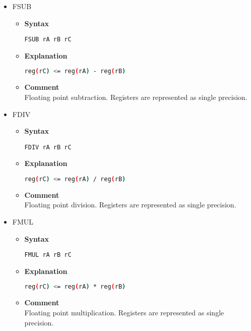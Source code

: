 \begin{itemize}
    \item FSUB
    \begin{itemize}
        \item \textbf{Syntax}
        \begin{lstlisting}[language={[markII]Assembler}, frame=single]
    FSUB rA rB rC
        \end{lstlisting}
        \item \textbf{Explanation}
        \begin{lstlisting}[language=bash, frame=single]
    reg(rC) <= reg(rA) - reg(rB)
        \end{lstlisting}
        \item \textbf{Comment} \\
        Floating point subtraction. Registers are represented as single precision.
    \end{itemize}

    \item FDIV
    \begin{itemize}
        \item \textbf{Syntax}
        \begin{lstlisting}[language={[markII]Assembler}, frame=single]
    FDIV rA rB rC
        \end{lstlisting}
        \item \textbf{Explanation}
        \begin{lstlisting}[language=bash, frame=single]
    reg(rC) <= reg(rA) / reg(rB)
        \end{lstlisting}
        \item \textbf{Comment} \\
        Floating point division. Registers are represented as single precision.
    \end{itemize}

    \item FMUL
    \begin{itemize}
        \item \textbf{Syntax}
        \begin{lstlisting}[language={[markII]Assembler}, frame=single]
    FMUL rA rB rC
        \end{lstlisting}
        \item \textbf{Explanation}
        \begin{lstlisting}[language=bash, frame=single]
    reg(rC) <= reg(rA) * reg(rB)
        \end{lstlisting}
        \item \textbf{Comment} \\
        Floating point multiplication. Registers are represented as single precision.
    \end{itemize}

\end{itemize}
